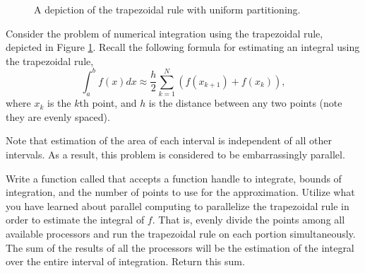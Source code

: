 \begin{figure}[H]

\begin{center}
		
\end{center}
\label{fig:traprule}
\caption{A depiction of the trapezoidal rule with uniform partitioning.}
\end{figure}

\begin{problem}
Consider the problem of numerical integration using the trapezoidal rule, depicted in Figure \ref{fig:traprule}.
Recall the following formula for estimating an integral using the trapezoidal rule,
\[
\int_{a}^b f(x) dx \approx \frac{h}{2} \sum_{k=1}^N (f(x_{k+1}) + f(x_k)),
\]
where $x_k$ is the $k$th point, and $h$ is the distance between any two points (note they are evenly spaced).

Note that estimation of the area of each interval is independent of all other intervals. 
As a result, this problem is considered to be embarrassingly parallel.

Write a function called  that accepts a function handle to integrate, bounds of integration, and the number of points to use for the approximation. 
Utilize what you have learned about parallel computing to parallelize the trapezoidal rule in order to estimate the integral of $f$. 
That is, evenly divide the points among all available processors and run the trapezoidal rule on each portion simultaneously.
The sum of the results of all the processors will be the estimation of the integral over the entire interval of integration.
Return this sum. 
\end{problem}




